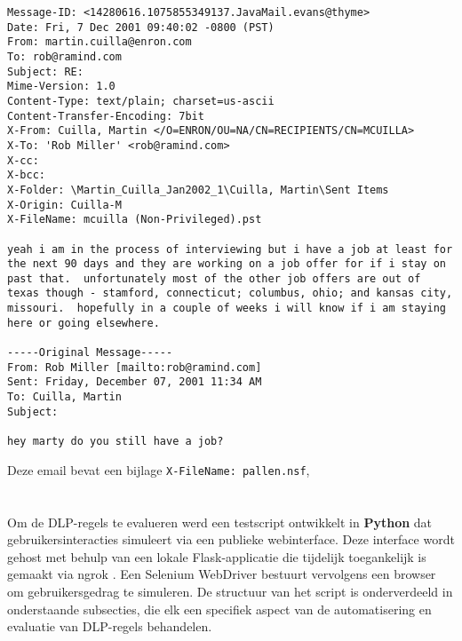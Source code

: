 \begin{lstlisting}[style=custompython, caption={Voorbeeld van een email uit de Enron dataset}, label={lst:dlp-email-ex}, captionpos=b]
Message-ID: <14280616.1075855349137.JavaMail.evans@thyme>
Date: Fri, 7 Dec 2001 09:40:02 -0800 (PST)
From: martin.cuilla@enron.com
To: rob@ramind.com
Subject: RE:
Mime-Version: 1.0
Content-Type: text/plain; charset=us-ascii
Content-Transfer-Encoding: 7bit
X-From: Cuilla, Martin </O=ENRON/OU=NA/CN=RECIPIENTS/CN=MCUILLA>
X-To: 'Rob Miller' <rob@ramind.com>
X-cc: 
X-bcc: 
X-Folder: \Martin_Cuilla_Jan2002_1\Cuilla, Martin\Sent Items
X-Origin: Cuilla-M
X-FileName: mcuilla (Non-Privileged).pst

yeah i am in the process of interviewing but i have a job at least for the next 90 days and they are working on a job offer for if i stay on past that.  unfortunately most of the other job offers are out of texas though - stamford, connecticut; columbus, ohio; and kansas city, missouri.  hopefully in a couple of weeks i will know if i am staying here or going elsewhere.

-----Original Message-----
From: Rob Miller [mailto:rob@ramind.com]
Sent: Friday, December 07, 2001 11:34 AM
To: Cuilla, Martin
Subject: 

hey marty do you still have a job?
\end{lstlisting}

Deze email bevat een bijlage \texttt{X-FileName: pallen.nsf}, 

\section{}
\label{sec:automatisering-poc}

Om de DLP-regels te evalueren werd een testscript ontwikkelt in \textbf{Python} dat gebruikersinteracties simuleert via een publieke webinterface. 
Deze interface wordt gehost met behulp van een lokale Flask-applicatie die tijdelijk toegankelijk is gemaakt via ngrok \autocite{Ngrok2025Flask}. 
Een Selenium WebDriver bestuurt vervolgens een browser om gebruikersgedrag te simuleren.
De structuur van het script is onderverdeeld in onderstaande subsecties, die elk een specifiek aspect van de automatisering en evaluatie van DLP-regels behandelen.

